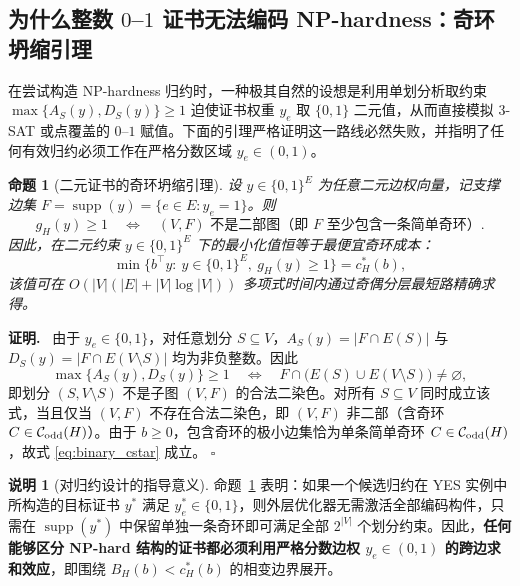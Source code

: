 \documentclass[11pt,a4paper]{ctexart}
\newtheorem{proposition}[theorem]{命题}
\theoremstyle{definition}
\newtheorem{remark}[theorem]{说明}
\newenvironment{proofcn}{\par\noindent\textbf{证明.}\ }{\hfill$\square$\par}
\newcommand{\Odd}{\mathcal C_{\rm odd}}
\newcommand{\1}{\boldsymbol 1}
\newcommand{\0}{\boldsymbol 0}
\begin{document}
\subsection{为什么整数 $0$--$1$ 证书无法编码 NP-hardness：奇环坍缩引理}
在尝试构造 NP-hardness 归约时，一种极其自然的设想是利用单划分析取约束 $\max\{A_S(y),D_S(y)\}\ge 1$ 迫使证书权重 $y_e$ 取 $\{0,1\}$ 二元值，从而直接模拟 3-SAT 或点覆盖的 $0$--$1$ 赋值。下面的引理严格证明这一路线必然失败，并指明了任何有效归约必须工作在严格分数区域 $y_e\in(0,1)$。

\begin{proposition}[二元证书的奇环坍缩引理]\label{prop:binary_collapse}
设 $y\in\{0,1\}^E$ 为任意二元边权向量，记支撑边集 $F=\operatorname{supp}(y)=\{e\in E:y_e=1\}$。则
\begin{equation}\label{eq:binary_iff}
 g_H(y)\ge 1 \quad\Longleftrightarrow\quad (V,F)\text{ 不是二部图（即 }F\text{ 至少包含一条简单奇环）}.
\end{equation}
因此，在二元约束 $y\in\{0,1\}^E$ 下的最小化值恒等于最便宜奇环成本：
\begin{equation}\label{eq:binary_cstar}
 \min\bigl\{b^\top y:\ y\in\{0,1\}^E,\ g_H(y)\ge 1\bigr\}=c_H^*(b),
\end{equation}
该值可在 $O(|V|(|E|+|V|\log|V|))$ 多项式时间内通过奇偶分层最短路精确求得。
\end{proposition}
\begin{proofcn}
由于 $y_e\in\{0,1\}$，对任意划分 $S\subseteq V$，$A_S(y)=|F\cap E(S)|$ 与 $D_S(y)=|F\cap E(V\setminus S)|$ 均为非负整数。因此
\[
 \max\{A_S(y),D_S(y)\}\ge 1 \quad\Longleftrightarrow\quad F\cap\bigl(E(S)\cup E(V\setminus S)\bigr)\neq\varnothing,
\]
即划分 $(S,V\setminus S)$ 不是子图 $(V,F)$ 的合法二染色。对所有 $S\subseteq V$ 同时成立该式，当且仅当 $(V,F)$ 不存在合法二染色，即 $(V,F)$ 非二部（含奇环 $C\in\Odd(H)$）。由于 $b\ge 0$，包含奇环的极小边集恰为单条简单奇环 $C\in\Odd(H)$，故式 \eqref{eq:binary_cstar} 成立。
\end{proofcn}

\begin{remark}[对归约设计的指导意义]
命题~\ref{prop:binary_collapse} 表明：如果一个候选归约在 YES 实例中所构造的目标证书 $y^*$ 满足 $y^*_e\in\{0,1\}$，则外层优化器无需激活全部编码构件，只需在 $\operatorname{supp}(y^*)$ 中保留单独一条奇环即可满足全部 $2^{|V|}$ 个划分约束。因此，\textbf{任何能够区分 NP-hard 结构的证书都必须利用严格分数边权 $y_e\in(0,1)$ 的跨边求和效应}，即围绕 $B_H(b)<c_H^*(b)$ 的相变边界展开。
\end{remark}
\end{document}

